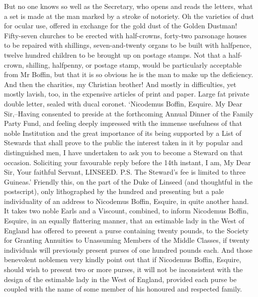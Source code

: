 But no one knows so well as the Secretary, who opens and reads the
letters, what a set is made at the man marked by a stroke of notoriety.
Oh the varieties of dust for ocular use, offered in exchange for the
gold dust of the Golden Dustman! Fifty-seven churches to be erected with
half-crowns, forty-two parsonage houses to be repaired with shillings,
seven-and-twenty organs to be built with halfpence, twelve hundred
children to be brought up on postage stamps. Not that a half-crown,
shilling, halfpenny, or postage stamp, would be particularly acceptable
from Mr Boffin, but that it is so obvious he is the man to make up the
deficiency. And then the charities, my Christian brother! And mostly in
difficulties, yet mostly lavish, too, in the expensive articles of print
and paper. Large fat private double letter, sealed with ducal coronet.
‘Nicodemus Boffin, Esquire. My Dear Sir,--Having consented to preside
at the forthcoming Annual Dinner of the Family Party Fund, and feeling
deeply impressed with the immense usefulness of that noble Institution
and the great importance of its being supported by a List of Stewards
that shall prove to the public the interest taken in it by popular and
distinguished men, I have undertaken to ask you to become a Steward on
that occasion. Soliciting your favourable reply before the 14th instant,
I am, My Dear Sir, Your faithful Servant, LINSEED. P.S. The Steward’s
fee is limited to three Guineas.’ Friendly this, on the part of the Duke
of Linseed (and thoughtful in the postscript), only lithographed by
the hundred and presenting but a pale individuality of an address to
Nicodemus Boffin, Esquire, in quite another hand. It takes two noble
Earls and a Viscount, combined, to inform Nicodemus Boffin, Esquire,
in an equally flattering manner, that an estimable lady in the West of
England has offered to present a purse containing twenty pounds, to
the Society for Granting Annuities to Unassuming Members of the Middle
Classes, if twenty individuals will previously present purses of one
hundred pounds each. And those benevolent noblemen very kindly point out
that if Nicodemus Boffin, Esquire, should wish to present two or more
purses, it will not be inconsistent with the design of the estimable
lady in the West of England, provided each purse be coupled with the
name of some member of his honoured and respected family.


